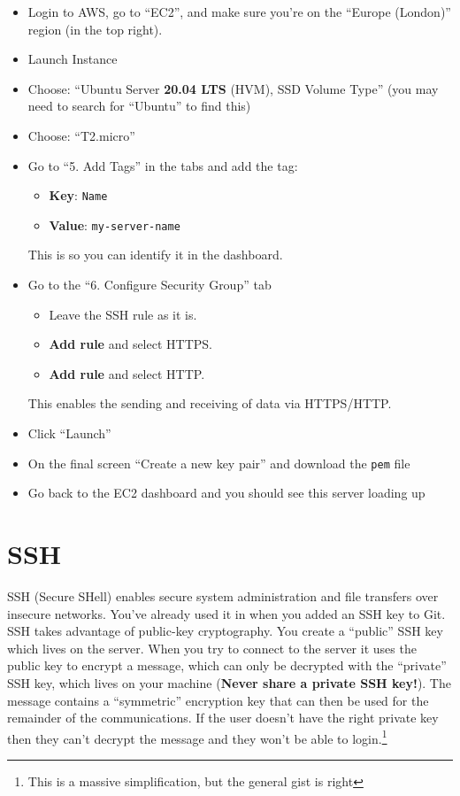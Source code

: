 \begin{itemize}
    \item Login to AWS, go to ``EC2'', and make sure you're on the ``Europe (London)'' region (in the top right).
    \item Launch Instance
    \item Choose: ``Ubuntu Server \textbf{20.04 LTS} (HVM), SSD Volume Type'' (you may need to search for ``Ubuntu'' to find this)
    \item Choose: ``T2.micro''
    \item Go to ``5. Add Tags'' in the tabs and add the tag:
        \begin{itemize}
            \item \textbf{Key}: \texttt{Name}
            \item \textbf{Value}: \texttt{my-server-name}
        \end{itemize}
        This is so you can identify it in the dashboard.

    \item Go to the ``6. Configure Security Group'' tab
        \begin{itemize}
            \item Leave the SSH rule as it is.
            \item \textbf{Add rule} and select HTTPS.
            \item \textbf{Add rule} and select HTTP.
        \end{itemize}
         This enables the sending and receiving of data via HTTPS/HTTP.
    \item Click ``Launch''
    \item On the final screen ``Create a new key pair'' and download the \texttt{pem} file
    \item Go back to the EC2 dashboard and you should see this server loading up
\end{itemize}


\section{SSH}

SSH (Secure SHell) enables secure system administration and file transfers over insecure networks. You've already used it in when you added an SSH key to Git.
\\

SSH takes advantage of public-key cryptography. You create a ``public'' SSH key which lives on the server. When you try to connect to the server it uses the public key to encrypt a message, which can only be decrypted with the ``private'' SSH key, which lives on your machine (\textbf{Never share a private SSH key!}). The message contains a ``symmetric'' encryption key that can then be used for the remainder of the communications. If the user doesn't have the right private key then they can't decrypt the message and they won't be able to login.\footnote{This is a massive simplification, but the general gist is right}
\\

